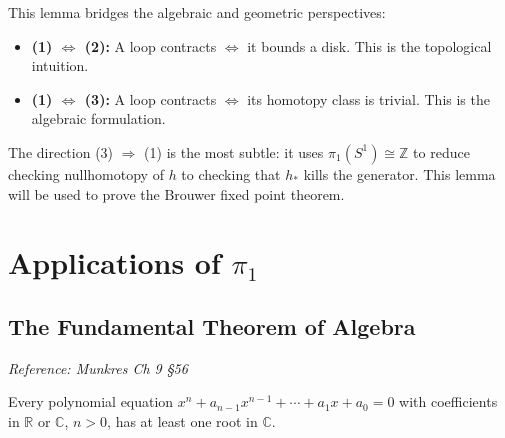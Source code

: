 \documentclass[11pt]{report}
\begin{document}
\begin{rembox}
This lemma bridges the algebraic and geometric perspectives:
\begin{itemize}[nosep]
    \item \textbf{(1) $\Leftrightarrow$ (2):} A loop contracts $\Leftrightarrow$ it bounds a disk. This is the topological intuition.
    \item \textbf{(1) $\Leftrightarrow$ (3):} A loop contracts $\Leftrightarrow$ its homotopy class is trivial. This is the algebraic formulation.
\end{itemize}
The direction (3) $\Rightarrow$ (1) is the most subtle: it uses $\pi_1(S^1) \cong \mathbb{Z}$ to reduce checking nullhomotopy of $h$ to checking that $h_*$ kills the generator. This lemma will be used to prove the Brouwer fixed point theorem.
\end{rembox}

\chapter{Applications of \texorpdfstring{$\pi_1$}{π₁}}

\section{The Fundamental Theorem of Algebra}

\textit{Reference: Munkres Ch 9 \S 56}

\begin{thmbox}
Every polynomial equation $x^n + a_{n-1}x^{n-1} + \cdots + a_1 x + a_0 = 0$ with coefficients in $\mathbb{R}$ or $\mathbb{C}$, $n > 0$, has at least one root in $\mathbb{C}$.
\end{thmbox}
\end{document}
